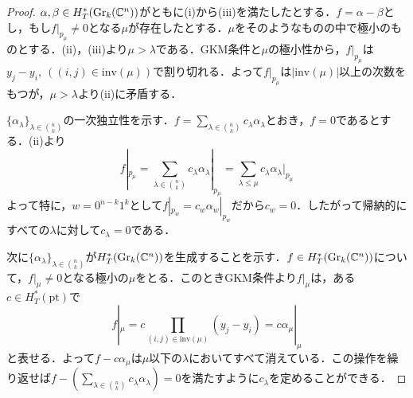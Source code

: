 \begin{proof}
  $\alpha,\beta\in H^*_T(\text{Gr}_k(\mathbb{C}^n))$がともに(i)から(iii)を満たしたとする．$f=\alpha-\beta$とし，もし$f|_{p_\mu}\neq 0$となる$\mu$が存在したとする．$\mu$をそのようなものの中で極小のものとする．(ii)，(iii)より$\mu > \lambda$である．GKM条件と$\mu$の極小性から，$f|_{p_\mu}$は$y_j - y_i,\:((i,j)\in\text{inv}(\mu))$で割り切れる．よって$f|_{p_\mu}$は$|\text{inv}(\mu)|$以上の次数をもつが，$\mu > \lambda$より(ii)に矛盾する．

  $\{\alpha_\lambda\}_{\lambda\in\binom{n}{k}}$の一次独立性を示す．$f=\sum_{\lambda\in\binom{n}{k}}c_\lambda\alpha_\lambda$とおき，$f=0$であるとする．(ii)より
  \[
  f|_{p_\mu}
  =\sum_{\lambda\in\binom{n}{k}}c_\lambda\alpha_\lambda|_{p_\mu}
  =\sum_{\lambda \leq \mu}c_\lambda\alpha_\lambda|_{p_\mu}
  \]
  よって特に，$w=0^{n-k}1^k$として$f|_{p_w}=c_w\alpha_w|_{p_w}$だから$c_w = 0$．したがって帰納的にすべての$\lambda$に対して$c_\lambda = 0$である．

  次に$\{\alpha_\lambda\}_{\lambda\in\binom{n}{k}}$が$H^*_T(\text{Gr}_k(\mathbb{C}^n))$を生成することを示す．$f\in H^*_T(\text{Gr}_k(\mathbb{C}^n))$について，$f|_\mu \neq 0$となる極小の$\mu$をとる．このときGKM条件より$f|_\mu$は，ある$c\in H^*_T(\text{pt})$で
  \[
  f|_\mu = c\prod_{(i,j)\in\text{inv}(\mu)}(y_j-y_i) = c \alpha_\mu|_\mu
  \]
  と表せる．よって$f - c\alpha_\mu$は$\mu$以下の$\lambda$においてすべて消えている．この操作を繰り返せば$f - (\sum_{\lambda\in\binom{n}{k}}c_\lambda\alpha_\lambda)=0$を満たすように$c_\lambda$を定めることができる．
\end{proof}

